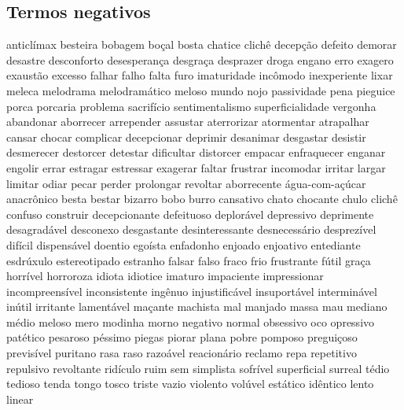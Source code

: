 \documentclass[ruledheader]{abnt_UFF}
\begin{document}
\subsection{Termos negativos}
anticl\'{i}max besteira bobagem bo\c{c}al bosta chatice clich\^{e} decep\c{c}\~ao defeito demorar desastre desconforto desesperan\c{c}a desgra\c{c}a desprazer droga engano erro exagero exaust\~ao excesso falhar falho falta furo imaturidade inc\^{o}modo inexperiente lixar meleca melodrama melodram\'{a}tico meloso mundo nojo passividade pena pieguice porca porcaria problema sacrif\'{i}cio sentimentalismo superficialidade vergonha abandonar aborrecer arrepender assustar aterrorizar atormentar atrapalhar cansar chocar complicar decepcionar deprimir desanimar desgastar desistir desmerecer destorcer detestar dificultar distorcer empacar enfraquecer enganar engolir errar estragar estressar exagerar faltar frustrar incomodar irritar largar limitar odiar pecar perder prolongar revoltar aborrecente \'{a}gua-com-a\c{c}\'{u}car anacr\^{o}nico besta bestar bizarro bobo burro cansativo chato chocante chulo clich\^{e} confuso construir decepcionante defeituoso deplor\'{a}vel depressivo deprimente desagrad\'{a}vel desconexo desgastante desinteressante desnecess\'{a}rio desprez\'{i}vel dif\'{i}cil dispens\'{a}vel doentio ego\'{i}sta enfadonho enjoado enjoativo entediante esdr\'{u}xulo estereotipado estranho falsar falso fraco frio frustrante f\'{u}til gra\c{c}a horr\'{i}vel horroroza idiota idiotice imaturo impaciente impressionar incompreens\'{i}vel inconsistente ing\^{e}nuo injustific\'{a}vel insuport\'{a}vel intermin\'{a}vel in\'{u}til irritante lament\'{a}vel ma\c{c}ante machista mal manjado massa mau mediano m\'{e}dio meloso mero modinha morno negativo normal obsessivo oco opressivo pat\'{e}tico pesaroso p\'{e}ssimo piegas piorar plana pobre pomposo pregui\c{c}oso previs\'{i}vel puritano rasa raso razo\'{a}vel reacion\'{a}rio reclamo repa repetitivo repulsivo revoltante rid\'{i}culo ruim sem simplista sofr\'{i}vel superficial surreal t\'{e}dio tedioso tenda tongo tosco triste vazio violento vol\'{u}vel est\'{a}tico id\^{e}ntico lento linear 
\end{document}
